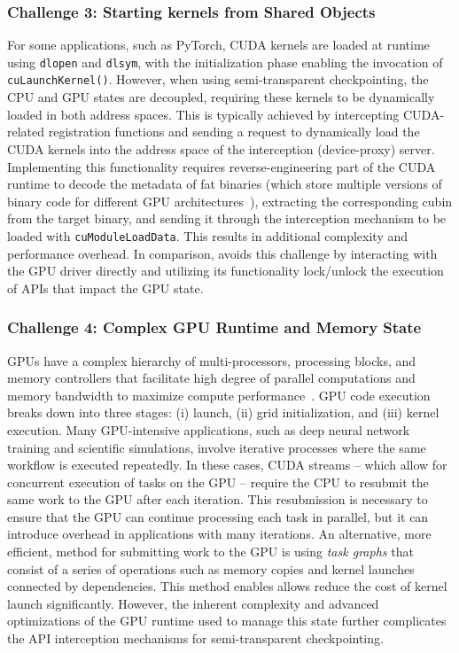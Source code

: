 \subsubsection*{Challenge 3: Starting kernels from Shared Objects}%
For some applications, such as PyTorch, CUDA kernels are loaded at runtime using \texttt{dlopen} and \texttt{dlsym}, with the initialization phase enabling the invocation of \texttt{cuLaunchKernel()}. However, when using semi-transparent checkpointing, the CPU and GPU states are decoupled, requiring these kernels to be dynamically loaded in both address spaces. This is typically achieved by intercepting CUDA-related registration functions and sending a request to dynamically load the CUDA kernels into the address space of the interception (device-proxy) server. Implementing this functionality requires reverse-engineering part of the CUDA runtime to decode the metadata of fat binaries (which store multiple versions of binary code for different GPU architectures~\cite{harris2024cuda}), extracting the corresponding cubin from the target binary, and sending it through the interception mechanism to be loaded with \texttt{cuModuleLoadData}. This results in additional complexity and performance overhead. In comparison, \sys avoids this challenge by interacting with the GPU driver directly and utilizing its functionality lock/unlock the execution of APIs that impact the GPU state.  

\subsubsection*{Challenge 4: Complex GPU Runtime and Memory State}%
GPUs have a complex hierarchy of multi-processors, processing blocks, and memory controllers that facilitate high degree of parallel computations and memory bandwidth to maximize compute performance~\cite{nvidia2022h100, nvidia2020a100, nvidia2017p100}.
%
GPU code execution breaks down into three stages: (i) launch, (ii) grid initialization, and (iii) kernel execution. Many GPU-intensive applications, such as deep neural network training and scientific simulations, involve iterative processes where the same workflow is executed repeatedly. In these cases, CUDA streams -- which allow for concurrent execution of tasks on the GPU -- require the CPU to resubmit the same work to the GPU after each iteration. This resubmission is necessary to ensure that the GPU can continue processing each task in parallel, but it can introduce overhead in applications with many iterations. An alternative, more efficient, method for submitting work to the GPU is using \textit{task graphs} that consist of a series of operations such as memory copies and kernel launches connected by dependencies. This method enables allows reduce the cost of kernel launch significantly. However, the inherent complexity and advanced optimizations of the GPU runtime used to manage this state further complicates the API interception mechanisms for semi-transparent checkpointing.

